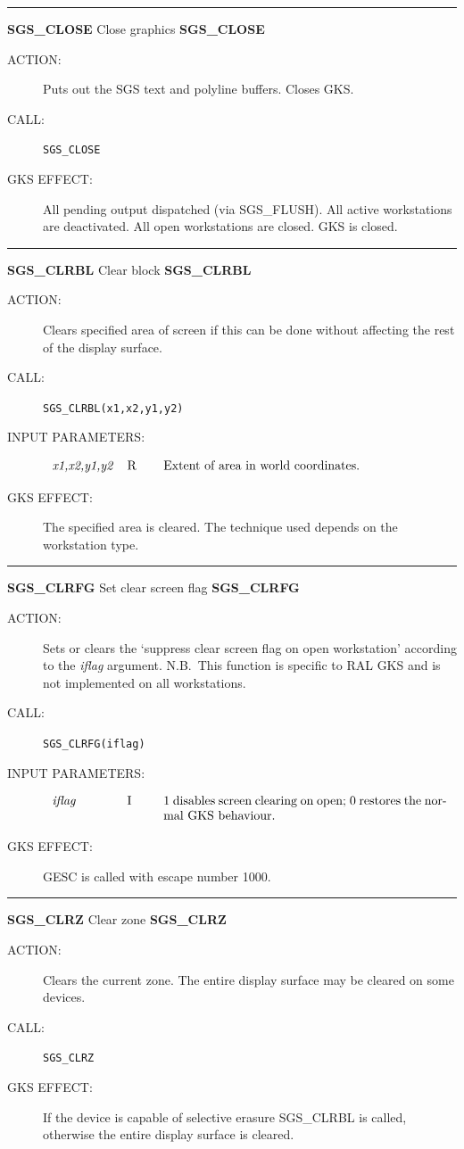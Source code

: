 \documentclass[11pt]{article}
\newcommand{\htmlref}[2]{#1}
\newcommand{\xlabel}[1]{}
\newcommand{\rthead}[2]{\rule{\textwidth}{0.3mm}
{\Large {\bf #1} \hfill #2 \hfill {\bf #1}}}
\newenvironment{params}%
{\[\begin{tabular}{p{0.14\textwidth}p{0.05\textwidth}p{0.66\textwidth}}}%
{\end{tabular}\]}
\newcommand{\rparams}[3]{{\em #1} &#2 &#3\\}
\newcommand{\rthead}[2]{\subsection{\label{#1}\xlabel{#1}#1 - #2}}
\newenvironment{params}{\begin{description}}{\end{description}}
\newcommand{\rparams}[3]{\item{{\em #1}} (#2) #3}
\begin{document}
\rthead{SGS\_CLOSE}{Close graphics}
\begin{description}
\item [ACTION:]
Puts out the SGS text and polyline buffers.
Closes GKS.
\item [CALL:]
{\tt SGS\_CLOSE}
\item [GKS EFFECT:]
All pending output dispatched (via \htmlref{SGS\_FLUSH}{SGS_FLUSH}).
All active workstations are deactivated.
All open workstations are closed.
GKS is closed.
\end{description}
\goodbreak

\rthead{SGS\_CLRBL}{Clear block}
\begin{description}
\item [ACTION:]
Clears specified area of screen if this can be done without affecting the rest
of the display surface.
\item [CALL:]
{\tt SGS\_CLRBL(x1,x2,y1,y2)}
\item [INPUT PARAMETERS:]
\begin{params}
\rparams{x1,x2,y1,y2}{R}{Extent of area in world coordinates.}
\end{params}
\item [GKS EFFECT:]
The specified area is cleared.
The technique used depends on the workstation type.
\end{description}
\goodbreak

\rthead{SGS\_CLRFG}{Set clear screen flag}
\begin{description}
\item [ACTION:]
Sets or clears the `suppress clear screen flag on open workstation' according
to the {\em iflag}\/ argument.
N.B.\ This function is specific to RAL GKS and is not implemented on all
workstations.
\item [CALL:]
{\tt SGS\_CLRFG(iflag)}
\item [INPUT PARAMETERS:]
\begin{params}
\rparams{iflag}{I}{1 disables screen clearing on open; 0 restores the normal
GKS behaviour.}
\end{params}
\item [GKS EFFECT:]
GESC is called with escape number 1000.
\end{description}
\goodbreak

\rthead{SGS\_CLRZ}{Clear zone}
\begin{description}
\item [ACTION:]
Clears the current zone.
The entire display surface may be cleared on some devices.
\item [CALL:]
{\tt SGS\_CLRZ}
\item [GKS EFFECT:]
If the device is capable of selective erasure
\htmlref{SGS\_CLRBL}{SGS_CLRBL} is called, otherwise
the entire display surface is cleared.
\end{description}
\goodbreak
\end{document}
